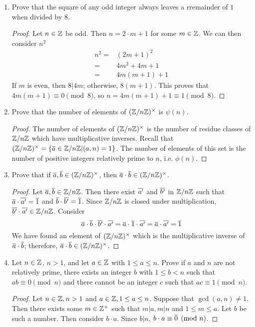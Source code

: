 \begin{enumerate}
\begin{proof}
%	
%	
%	
%	
%	
%	
	\end{proof}
	\item Prove that the square of any odd integer always leaves a rremainder of $1$ when divided by $8$.
	\begin{proof}
		Let $n\in\mathbb{Z}$ be odd.  Then $n = 2\cdot m+1$ for some $m\in\mathbb{Z}$.  We can then consider $n^2$
		\begin{align*}
		n^2 = & (2m+1)^2\\
		 = & 4m^2 + 4m + 1\\
		 = & 4m(m + 1) + 1
		\end{align*}
		If $m$ is even, then $8|4m$; otherwise, $8(m+1)$.  This proves that $4m(m+1) \equiv 0 \pmod 8$, so $n = 4m(m+1) + 1\equiv 1 \pmod 8$.
	\end{proof}
	\item Prove that the number of elements of $(\mathbb{Z}/n\mathbb{Z})^\times$ is $\psi(n)$.
	\begin{proof}
		The number of elements of $(\mathbb{Z}/n\mathbb{Z})^\times$ is the number of residue classes of $\mathbb{Z}/n\mathbb{Z}$ which have multiplicative inverses.  Recall that $(\mathbb{Z}/n\mathbb{Z})^\times = \left\{ \overline{a}\in\mathbb{Z}/n\mathbb{Z}|(a,n) = 1 \right\}$.  The number of elements of this set is the number of positive integers relatively prime to $n$, i.e. $\phi(n)$.
	\end{proof}
	\item Prove that if $\overline{a},\overline{b}\in(\mathbb{Z}/n\mathbb{Z})^\times$, then $\overline{a}\cdot\overline{b}\in(\mathbb{Z}/n\mathbb{Z})^\times$.
	\begin{proof}
		Let $\overline{a},\overline{b}\in\mathbb{Z}/n\mathbb{Z}$.  Then there exist $\overline{a'}$ and $\overline{b'}$ in $\mathbb{Z}/n\mathbb{Z}$ such that $\overline{a}\cdot\overline{a'} = \overline{1}$ and $\overline{b}\cdot\overline{b'} = \overline{1}$.  Since $\mathbb{Z}/n\mathbb{Z}$ is closed under multiplication, $\overline{b'}\cdot\overline{a'} \in \mathbb{Z}/n\mathbb{Z}$.  Consider
		$$\overline{a}\cdot\overline{b}\cdot \overline{b'}\cdot\overline{a'} = \overline{a}\cdot\overline{1}\cdot\overline{a'} = \overline{a}\cdot\overline{a'} = \overline{1}$$
		We have found an element of $(\mathbb{Z}/n\mathbb{Z})^\times$ which is the multiplicative inverse of $\overline{a}\cdot\overline{b}$; therefore, $\overline{a}\cdot\overline{b}\in(\mathbb{Z}/n\mathbb{Z})^\times$.
	\end{proof}
	\item Let $n\in\mathbb{Z}$, $n>1$, and let $a\in\mathbb{Z}$ with $1\leq a \leq n$.  Prove if $a$ and $n$ are not relatively prime, there exists an integer $b$ with $1\leq b<n$ such that $ab\equiv 0 \pmod n$ and there cannot be an integer $c$ such that $ac\equiv 1 \pmod n$.
	\begin{proof}
		Let $n\in\mathbb{Z},n>1$ and $a\in\mathbb{Z},1\leq a\leq n$.
		Suppose that $\gcd(a,n) \neq 1$.  Then there exists some $m\in\mathbb{Z}^+$ such that $m|a, m|n$ and $1\leq m\leq a$.  
		Let $b$ be such a number.  
		Then consider $b\cdot a$.  
		Since $b|n$, $b \cdot a \equiv \overline{0} \pmod n$.
		

\end{proof}
\end{enumerate}
